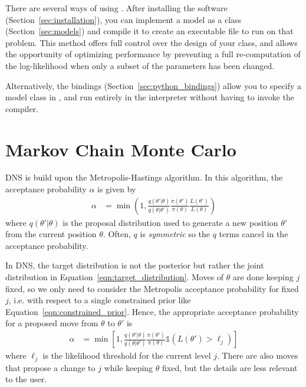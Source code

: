 \documentclass[article, nojss]{jss}
\newcommand{\params}{\theta}
\begin{document}
There are several ways of using . After installing the software
(Section~\ref{sec:installation}), you can implement a model as
a  class
(Section~\ref{sec:models}) and compile it to create an executable file
to run  on that problem. This method offers full control over the
design of your class, and allows the opportunity of optimizing
performance by preventing a full re-computation of the log-likelihood when
only a subset of the parameters has been changed.

Alternatively, the 
bindings (Section~\ref{sec:python_bindings}) allow you
to specify a model class in , and run  entirely
in the  interpreter without having to invoke the 
compiler.

\section{Markov Chain Monte Carlo}\label{sec:mcmc}
DNS is build upon the Metropolis-Hastings algorithm.
In this algorithm, the acceptance probability $\alpha$
is given by
\begin{align}
\alpha &= \min\left(1,
\frac{q(\params'|\params)}{q(\params | \params')}
\frac{\pi(\params')}{\pi(\params)}\frac{L(\params')}{L(\params)}
\right)
\end{align}
where $q(\theta' | \theta)$ is the proposal distribution used to generate
a new position $\theta'$ from the current position $\theta$. Often,
$q$ is {\em symmetric} so the $q$ terms cancel in the acceptance probability.

In DNS, the target distribution is not the posterior but rather
the joint distribution in Equation~\ref{eqn:target_distribution}.
Moves of $\theta$ are done keeping $j$ fixed, so we only need
to consider the Metropolis acceptance probability for fixed $j$,
i.e. with respect to a single constrained prior like
Equation~\ref{eqn:constrained_prior}.
Hence, the appropriate acceptance probability
for a proposed move from $\theta$ to $\theta'$ is
\begin{align}
\alpha &= \min\left[1,
\frac{q(\params'|\params)}{q(\params | \params')}
\frac{\pi(\params')}{\pi(\params)}
\mathds{1}\left(L(\params') > \ell_j\right)
\right]
\label{eqn:log_hastings}
\end{align}
where $\ell_j$ is the likelihood threshold for the current level $j$.
There are also moves that propose a change to $j$ while keeping
$\params$ fixed, but the details are less relevant to the user.
\end{document}
